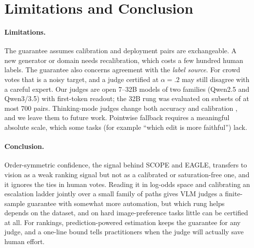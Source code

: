 \section{Limitations and Conclusion}\label{sec:limitations}

\paragraph{Limitations.}
The guarantee assumes calibration and deployment pairs are exchangeable. A new generator or domain needs recalibration, which costs a few hundred human labels.
The guarantee also concerns agreement with the \emph{label source}. For crowd votes that is a noisy target, and a judge certified at $\alpha=.2$ may still disagree with a careful expert.
Our judges are open 7--32B models of two families (Qwen2.5 and Qwen3/3.5) with first-token readout; the 32B rung was evaluated on subsets of at most 700 pairs. Thinking-mode judges change both accuracy and calibration \citep{welch2026the}, and we leave them to future work.
Pointwise fallback requires a meaningful absolute scale, which some tasks (for example ``which edit is more faithful'') lack.

\paragraph{Conclusion.}
Order-symmetric confidence, the signal behind SCOPE and EAGLE, transfers to vision as a weak ranking signal but not as a calibrated or saturation-free one, and it ignores the ties in human votes.
Reading it in log-odds space and calibrating an escalation ladder jointly over a small family of paths gives VLM judges a finite-sample guarantee with somewhat more automation, but which rung helps depends on the dataset, and on hard image-preference tasks little can be certified at all.
For rankings, prediction-powered estimation keeps the guarantee for any judge, and a one-line bound tells practitioners when the judge will actually save human effort.
